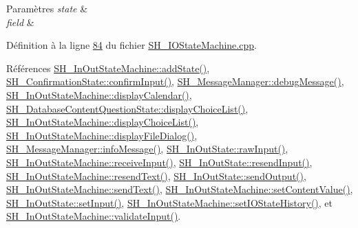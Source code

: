 \begin{DoxyParams}{Paramètres}
{\em state} & \\
\hline
{\em field} & \\
\hline
\end{DoxyParams}


Définition à la ligne \hyperlink{SH__IOStateMachine_8cpp_source_l00084}{84} du fichier \hyperlink{SH__IOStateMachine_8cpp_source}{S\-H\-\_\-\-I\-O\-State\-Machine.\-cpp}.



Références \hyperlink{classSH__InOutStateMachine_a3de9dedcdfd6efab868484c047638f71}{S\-H\-\_\-\-In\-Out\-State\-Machine\-::add\-State()}, \hyperlink{classSH__ConfirmationState_a039267260de5d102ac7511e6a5fae87f}{S\-H\-\_\-\-Confirmation\-State\-::confirm\-Input()}, \hyperlink{classSH__MessageManager_a379f2aa0a590a5add34dbe91f98b2ff7}{S\-H\-\_\-\-Message\-Manager\-::debug\-Message()}, \hyperlink{classSH__InOutStateMachine_ab3a12d1f9b658d8ffdc17669a6c065f2}{S\-H\-\_\-\-In\-Out\-State\-Machine\-::display\-Calendar()}, \hyperlink{classSH__DatabaseContentQuestionState_ae1e149ad7ab3d957f3c5df9ef078448b}{S\-H\-\_\-\-Database\-Content\-Question\-State\-::display\-Choice\-List()}, \hyperlink{classSH__InOutStateMachine_ab74b981b0aab09067d7479f2b7e79b0b}{S\-H\-\_\-\-In\-Out\-State\-Machine\-::display\-Choice\-List()}, \hyperlink{classSH__InOutStateMachine_abd206c3bc32bb7690df9c3e1cd546ebc}{S\-H\-\_\-\-In\-Out\-State\-Machine\-::display\-File\-Dialog()}, \hyperlink{classSH__MessageManager_a0b35c2f96e6d69934bf7f7c1e2172ea9}{S\-H\-\_\-\-Message\-Manager\-::info\-Message()}, \hyperlink{classSH__InOutState_a4c674a54f41d2e6ef951b22393dcd89f}{S\-H\-\_\-\-In\-Out\-State\-::raw\-Input()}, \hyperlink{classSH__InOutStateMachine_a037ed5e13ecfae2123a8d4940292e410}{S\-H\-\_\-\-In\-Out\-State\-Machine\-::receive\-Input()}, \hyperlink{classSH__InOutState_a1f00480afefd173002cf56d4c4128048}{S\-H\-\_\-\-In\-Out\-State\-::resend\-Input()}, \hyperlink{classSH__InOutStateMachine_a526822c66b46aa0cd81ba4473fa5573f}{S\-H\-\_\-\-In\-Out\-State\-Machine\-::resend\-Text()}, \hyperlink{classSH__InOutState_a77921c5f42059bc97361f4ff7827da12}{S\-H\-\_\-\-In\-Out\-State\-::send\-Output()}, \hyperlink{classSH__InOutStateMachine_a5e7f5958bae31696b6a8deab94ad2b4f}{S\-H\-\_\-\-In\-Out\-State\-Machine\-::send\-Text()}, \hyperlink{classSH__InOutStateMachine_a9ab1534306b2bdb62743d4bcefe40c17}{S\-H\-\_\-\-In\-Out\-State\-Machine\-::set\-Content\-Value()}, \hyperlink{classSH__InOutState_aaec9c2b5ef7c406bff7469461352d47c}{S\-H\-\_\-\-In\-Out\-State\-::set\-Input()}, \hyperlink{classSH__InOutStateMachine_acbcce2c4300af1634d928b30e5e9be1c}{S\-H\-\_\-\-In\-Out\-State\-Machine\-::set\-I\-O\-State\-History()}, et \hyperlink{classSH__InOutStateMachine_aec1b3fef3c1f82499aa1f73beaecd08a}{S\-H\-\_\-\-In\-Out\-State\-Machine\-::validate\-Input()}.



